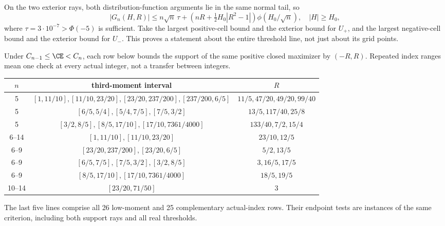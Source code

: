 On the two exterior rays, both distribution-function arguments lie
in the same normal tail, so
\[
 |G_n(H,R)|\le n\sqrt n\,\tau+
 \left(nR+\tfrac12H_0|R^2-1|\right)\phi(H_0/\sqrt n),
 \quad |H|\ge H_0,
\]
where $\tau=3\cdot10^{-7}>\Phi(-5)$ is sufficient.
Take the largest positive-cell bound and the exterior bound for
$U_+$, and the largest negative-cell bound and the exterior bound
for $U_-$. This proves a statement about the entire threshold line,
not just about its grid points.



\begin{proposition}\label{j:finite:supportrows}
Under $C_{n-1}\le\CE<C_n$, each row below bounds the support of the
same positive closed maximizer by $(-R,R)$. Repeated index ranges mean
one check at every actual integer, not a transfer between integers.
\begin{center}\small
\begin{tabular}{c|c|c}
$n$&third-moment interval&$R$\\\hline
5&$[1,11/10],[11/10,23/20],[23/20,237/200],[237/200,6/5]$
 &$11/5,47/20,49/20,99/40$\\
5&$[6/5,5/4],[5/4,7/5],[7/5,3/2]$&$13/5,117/40,25/8$\\
5&$[3/2,8/5],[8/5,17/10],[17/10,7361/4000]$&$133/40,7/2,15/4$\\
6--14&$[1,11/10],[11/10,23/20]$&$23/10,12/5$\\
6--9&$[23/20,237/200],[23/20,6/5]$&$5/2,13/5$\\
6--9&$[6/5,7/5],[7/5,3/2],[3/2,8/5]$&$3,16/5,17/5$\\
6--9&$[8/5,17/10],[17/10,7361/4000]$&$18/5,19/5$\\
10--14&$[23/20,71/50]$&$3$
\end{tabular}
\end{center}
The last five lines comprise all 26 low-moment and 25 complementary
actual-index rows. Their endpoint tests are instances of the same
criterion, including both support rays and all real thresholds.
\end{proposition}
